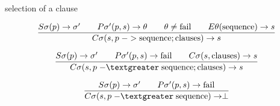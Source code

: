 \begin{frame}{selection of a clause}

$$\frac{
  S\sigma(p) \rightarrow \sigma' \qquad
  P\sigma'(p, s) \rightarrow \theta \qquad
  \theta \not = {\rm fail} \qquad
  E\theta({\rm sequence}) \rightarrow s}{
C\sigma(s, p \;{\rm ->}\;    {\rm sequence} ; {\rm clauses}) \rightarrow s}$$

\pause \vspace{10pt}

$$\frac{
  S\sigma(p) \rightarrow \sigma'   \qquad
  P\sigma'(p, s) \rightarrow {\rm fail} \qquad
  C\sigma(s, {\rm clauses}) \rightarrow s}{
C\sigma(s, p \;{\rm -\textgreater}\;  {\rm sequence} ; {\rm clauses}) \rightarrow s}$$

\pause \vspace{10pt}

$$\frac{
  S\sigma(p) \rightarrow \sigma' \qquad
  P\sigma'(p, s) \rightarrow {\rm fail} }{
C\sigma(s, p \;{\rm -\textgreater}\;  {\rm sequence}) \rightarrow \perp}$$


\end{frame}

